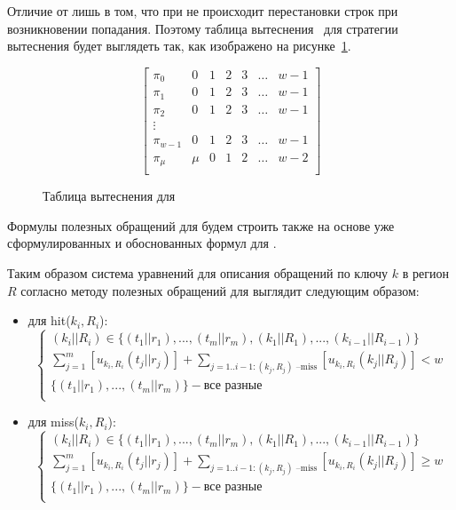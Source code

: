 Отличие от \LRU лишь в том, что при \FIFO не происходит перестановки
строк при возникновении попадания. Поэтому таблица
вытеснения~\cite{policy_tables} для стратегии вытеснения \FIFO будет
выглядеть так, как изображено на рисунке~\ref{fifo_policy_table}.

\begin{figure}[h]
$$
  \left[
    \begin{array}{c|cccccc}
      \pi_0 & 0 & 1 & 2 & 3 & \dots & w{-}1 \\
      \pi_1 & 0 & 1 & 2 & 3 & \dots & w{-}1 \\
      \pi_2 & 0 & 1 & 2 & 3 & \dots & w{-}1 \\
      \vdots &  &  &  & & & \\
      \pi_{w-1} & 0 & 1 & 2 & 3 & \dots & w{-}1 \\
      \pi_{\mu} & \mu & 0 & 1 & 2 & \dots & w{-}2 \\
    \end{array}
  \right]
$$
\caption{Таблица вытеснения для \FIFO}\label{fifo_policy_table}
\end{figure}

Формулы полезных обращений для \FIFO будем строить также на основе уже сформулированных и обоснованных формул для \LRU.


Таким образом система уравнений для описания обращений по ключу $k$ в регион $R$
согласно методу полезных обращений для \FIFO выглядит следующим образом:
\begin{itemize}
\item для hit($k_i, R_i$):
$$
\left\{\begin{array}{l} (k_i||R_i) \in \{(t_1||r_1), ..., (t_m||r_m), (k_1||R_1), ..., (k_{i-1}||R_{i-1})\}\\
\sum\limits_{j=1}^m [u_{k_i,R_i}(t_j||r_j)] + \sum\limits_{j=1..{i-1}:(k_j,R_j)\mbox{~--miss}} [u_{k_i,R_i}(k_j||R_j)] < w\\
\{(t_1||r_1), ..., (t_m||r_m)\} - \mbox{все разные}\\
\end{array} \right.
$$
\item для miss($k_i, R_i$):
$$
\left\{\begin{array}{l} (k_i||R_i) \in \{(t_1||r_1), ..., (t_m||r_m), (k_1||R_1), ..., (k_{i-1}||R_{i-1})\}\\
\sum\limits_{j=1}^m [u_{k_i,R_i}(t_j||r_j)] + \sum\limits_{j=1..{i-1}:(k_j,R_j)\mbox{~--miss}} [u_{k_i,R_i}(k_j||R_j)] \geqslant w\\
\{(t_1||r_1), ..., (t_m||r_m)\} - \mbox{все разные}\\
\end{array} \right.
$$
\end{itemize}

